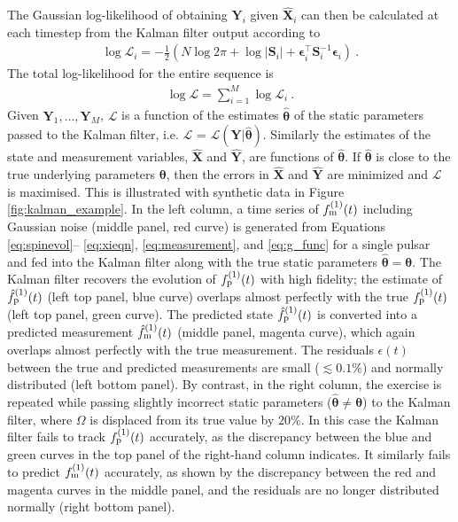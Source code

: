 \documentclass[fleqn,usenatbib,useAMS]{mnras}
\begin{document}
The Gaussian log-likelihood of obtaining ${\boldsymbol{Y}}_i$ given ${\boldsymbol{\hat X}}_i$ can  then be calculated at each timestep from the Kalman filter output according to
\begin{eqnarray}
	\log \mathcal{L}_i =  -\frac{1}{2} \left (N \log 2 \pi + \log  \left | \boldsymbol{S}_i \right | + \boldsymbol{\epsilon}_i^{\intercal} \boldsymbol{S}_i^{-1}  \boldsymbol{\epsilon}_i \right ) \ .
\end{eqnarray}
The total log-likelihood for the entire sequence is
\begin{eqnarray}
	\log \mathcal{L} =  \sum_{i=1}^{M} \log \mathcal{L}_i \ . \label{eq:likelihood}
\end{eqnarray}
Given ${\boldsymbol{Y}}_1, \dots, {\boldsymbol{Y}}_M$, $\mathcal{L}$ is a function of the estimates ${\boldsymbol{\hat \theta}}$ of the static parameters passed to the Kalman filter, i.e. $\mathcal{L}$ = $\mathcal{L}(\boldsymbol{Y} | \boldsymbol{\hat \theta})$. Similarly the estimates of the state and measurement variables, $\hat{\boldsymbol{X}}$ and $\hat{\boldsymbol{Y}}$, are functions of $\boldsymbol{\hat \theta}$. If $\boldsymbol{\hat{\theta}}$ is close to the true underlying parameters $\boldsymbol{\theta}$, then the errors in $\hat{\boldsymbol{X}}$ and $\hat{\boldsymbol{Y}}$ are minimized and $\mathcal{L}$ is maximised. This is illustrated with synthetic data in Figure \ref{fig:kalman_example}. In the left column, a time series of $f_{\rm m}^{(1)}(t)$ including Gaussian noise (middle panel, red curve) is generated from Equations \eqref{eq:spinevol}-- \eqref{eq:xieqn}, \eqref{eq:measurement}, and \eqref{eq:g_func} for a single pulsar and fed into the Kalman filter along with the true static parameters ${\boldsymbol{\hat \theta}} = {\boldsymbol{\theta}}$. The Kalman filter recovers the evolution of $f_{\rm p}^{(1)}(t)$ with high fidelity; the estimate of $\hat{f}_{\rm p}^{(1)}(t)$ (left top panel, blue curve) overlaps almost perfectly with the true $f_{\rm p}^{(1)}(t)$ (left top panel, green curve). The predicted state $\hat{f}_{\rm p}^{(1)}(t)$ is converted  into a predicted measurement $\hat{f}_{\rm m}^{(1)}(t)$ (middle panel, magenta curve), which again overlaps almost perfectly with the true measurement. The residuals $\epsilon(t)$ between the true and predicted measurements are small ($\lesssim 0.1\%$) and normally distributed (left bottom panel). By contrast, in the right column, the exercise is repeated while passing slightly incorrect static parameters (${\boldsymbol{\hat\theta}} \neq {\boldsymbol{\theta}}$) to the Kalman filter, where $\Omega$ is displaced from its true value by $20 \%$. In this case the Kalman filter fails to track $f_{\rm p}^{(1)}(t)$ accurately, as the discrepancy between the blue and green curves in the top panel of the right-hand column indicates. It similarly fails to predict $f_{\rm m}^{(1)}(t)$ accurately, as shown by the discrepancy between the red and magenta curves in the middle panel, and the residuals are no longer distributed normally (right bottom panel).
\end{document}

